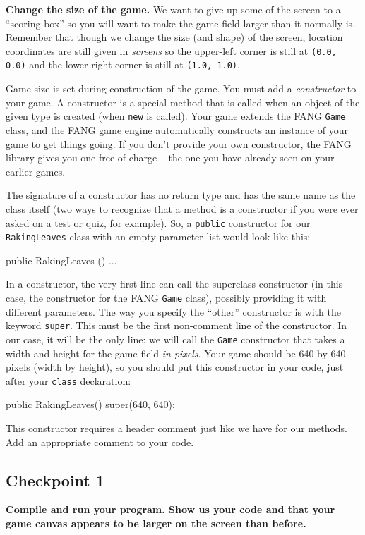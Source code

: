 \documentclass[12pt]{article}
\newenvironment{qv}%
  {\quote
   \verbatim}%
  {\endverbatim
   \endquote}
\newcommand{\code}{\texttt}
\begin{document}
\textbf{Change the size of the game.}
We want to give up some of the screen to a ``scoring box'' so you will
want to make the game field larger than it normally is. Remember that
though we change the size (and shape) of the screen, location
coordinates are still given in \emph{screens} so the upper-left corner
is still at \code{(0.0, 0.0)} and the lower-right corner is still at
\code{(1.0, 1.0)}. 

Game size is set during construction of the game. You must add a
\emph{constructor} to your game. A constructor is a special method
that is called when an object of the given type is created (when
\code{new} is called).  Your game extends the FANG \code{Game} class,
and the FANG game engine automatically constructs an instance of your
game to get things going.  If you don't provide your own constructor,
the FANG library gives you one free of charge -- the one you have
already seen on your earlier games.

The signature of a constructor has no return
type and has the same name as the class itself (two ways to recognize
that a method is a constructor if you were ever asked on a test or
quiz, for example). So, a \code{public} constructor for our
\code{RakingLeaves} class with an
empty parameter list would look like this:

\begin{qv}
public RakingLeaves () {
...
}
\end{qv}

In a constructor, the very first line can call the superclass constructor
(in this case, the constructor for the FANG \code{Game} class),
possibly providing it with different parameters.
The way you specify
the ``other'' constructor is with the keyword \code{super}.
This must be the first non-comment line of the
constructor.
In our case, it will be the only line: we will call
the \code{Game} constructor that takes a width and height for the game
field \emph{in pixels}. Your game should be 640 by 640 pixels (width
by height), so you should put this constructor in your code,
just after your \code{class} declaration:

\begin{qv}
public RakingLeaves() {
  super(640, 640);
}
\end{qv}

This constructor requires a header comment just like we have
for our methods.  Add an appropriate comment to your code.

\subsection*{Checkpoint 1}
{\bf
Compile and run your program.
Show us your code and that your game canvas
appears to be larger on the screen than before.
}
\end{document}

